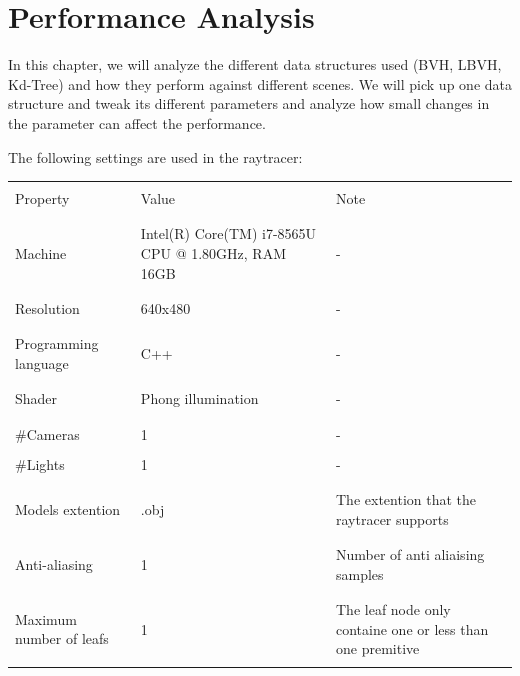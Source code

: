 \documentclass[11pt,a4paper]{article}
\begin{document}
\clearpage

\section{Performance Analysis}
In this chapter, we will analyze the different data structures used (BVH, LBVH, Kd-Tree) and how they perform against different scenes. We will pick up one data structure and tweak its different parameters and analyze how small changes in the parameter can affect the performance.


The following settings are used in the raytracer:
\begin{table}[ht] 
\centering 
{\footnotesize
\begin{tabular}{ P{2.5cm}||P{5cm}  P{5cm}}      %
\hline \hline
\\
Property & Value & Note \\ [0.5ex]
\\
\hline \hline
\\
Machine & Intel(R) Core(TM) i7-8565U CPU @ 1.80GHz, RAM 16GB & -\\ [0.5ex] %
\\
 \hline
 \\
Resolution & 640x480 & - \\
\\
 \hline
 \\
Programming language & C++ & - \\
\\ 
 \hline
 \\
Shader & Phong illumination & - \\
\\
 \hline
 \\
\#Cameras & 1 & - \\
\\
\#Lights & 1 & - \\
\\ 
 \hline
 \\
 Models extention& .obj& The extention that the raytracer supports \\
\\ 
 \hline
 \\
Anti-aliasing & 1 & Number of anti aliaising samples\\
\\ 
 \hline
 \\
Maximum number of leafs& 1 & The leaf node only containe one or less than one premitive\\
\\
\hline \hline
    \end{tabular}
}
\end{table}
\end{document}
